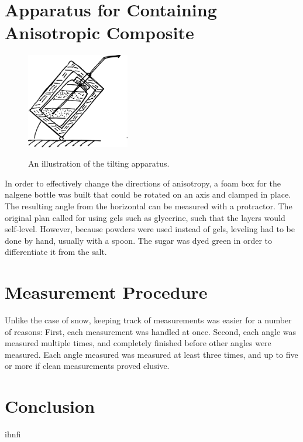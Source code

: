\section{Apparatus for Containing Anisotropic Composite}

\begin{figure}[h]
\centering
\includegraphics[width=0.4\textwidth]{fig/tilter.png}
\label{fig:tilter}
\caption{An illustration of the tilting apparatus.}
\end{figure}

In order to effectively change the directions of anisotropy, a foam box for the
nalgene bottle was built that could be rotated on an axis and clamped in place.
The resulting angle from the horizontal can be measured with a protractor. The
original plan called for using gels such as glycerine, such that the layers
would self-level. However, because powders were used instead of gels, leveling
had to be done by hand, usually with a spoon. The sugar was dyed green in order
 to differentiate it from the salt.

\section{Measurement Procedure}

Unlike the case of snow, keeping track of measurements was easier for a number
of reasons: First, each measurement was handled at once. Second, each angle
was measured multiple times, and completely finished before other angles were
measured. Each angle measured was measured at least three times, and up to five
or more if clean measurements proved elusive.

\section{Conclusion}

ihnfi
